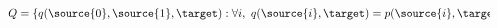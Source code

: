 \documentclass[final,serif,aspectratio=1610]{beamer}
\begin{document}
\begin{frame}
  \frametitle{}
  \framesubtitle{}
  \begin{columns}
    \begin{column}{1.0\textwidth}
      \begin{align*}
        Q = \left\{ q(\source{0}, \source{1}, \target) : \forall i,~ q(\source{i}, \target) = p(\source{i}, \target) \right\}
      \end{align*}

    \end{column}
    \begin{column}{1.0\textwidth}
    \end{column}
  \end{columns}
\end{frame}
\end{document}
